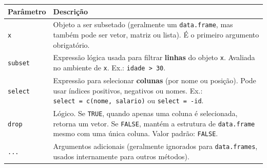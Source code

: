 \documentclass[
]{book}
\begin{document}
\begin{longtable}[]{@{}
  >{\raggedright\arraybackslash}p{}
  >{\raggedright\arraybackslash}p{}@{}}
\toprule\noalign{}
\begin{minipage}[b]{\linewidth}\raggedright
Parâmetro
\end{minipage} & \begin{minipage}[b]{\linewidth}\raggedright
Descrição
\end{minipage} \\
\midrule\noalign{}
\endhead
\bottomrule\noalign{}
\endlastfoot
\texttt{x} & Objeto a ser subsetado (geralmente um \texttt{data.frame}, mas também pode ser vetor, matriz ou lista). É o primeiro argumento obrigatório. \\
\texttt{subset} & Expressão lógica usada para filtrar \textbf{linhas} do objeto \texttt{x}. Avaliada no ambiente de \texttt{x}. Ex.: \texttt{idade\ \textgreater{}\ 30}. \\
\texttt{select} & Expressão para selecionar \textbf{colunas} (por nome ou posição). Pode usar índices positivos, negativos ou nomes. Ex.: \texttt{select\ =\ c(nome,\ salario)} ou \texttt{select\ =\ -id}. \\
\texttt{drop} & Lógico. Se \texttt{TRUE}, quando apenas uma coluna é selecionada, retorna um vetor. Se \texttt{FALSE}, mantém a estrutura de \texttt{data.frame} mesmo com uma única coluna. Valor padrão: \texttt{FALSE}. \\
\texttt{...} & Argumentos adicionais (geralmente ignorados para \texttt{data.frames}, usados internamente para outros métodos). \\
\end{longtable}
\end{document}
